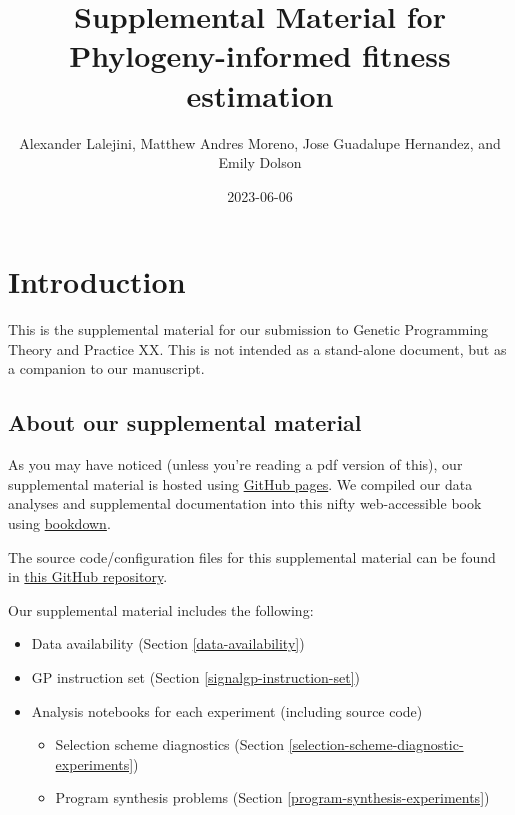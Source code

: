 \documentclass[
]{book}
\title{Supplemental Material for Phylogeny-informed fitness estimation}
\author{Alexander Lalejini, Matthew Andres Moreno, Jose Guadalupe Hernandez, and Emily Dolson}
\date{2023-06-06}
\providecommand{\tightlist}{%
  \setlength{\itemsep}{0pt}\setlength{\parskip}{0pt}}
\begin{document}
\maketitle

{
\setcounter{tocdepth}{1}
\tableofcontents
}
\hypertarget{introduction}{%
\chapter{Introduction}\label{introduction}}

This is the supplemental material for our submission to Genetic Programming Theory and Practice XX.
This is not intended as a stand-alone document, but as a companion to our manuscript.

\hypertarget{about-our-supplemental-material}{%
\section{About our supplemental material}\label{about-our-supplemental-material}}

As you may have noticed (unless you're reading a pdf version of this), our supplemental material is hosted using \href{https://pages.github.com/}{GitHub pages}.
We compiled our data analyses and supplemental documentation into this nifty web-accessible book using \href{https://bookdown.org}{bookdown}.

The source code/configuration files for this supplemental material can be found in \href{https://github.com/amlalejini/GPTP-2023-phylogeny-informed-evaluation}{this GitHub repository}.

Our supplemental material includes the following:

\begin{itemize}
\tightlist
\item
  Data availability (Section \ref{data-availability})
\item
  GP instruction set (Section \ref{signalgp-instruction-set})
\item
  Analysis notebooks for each experiment (including source code)

  \begin{itemize}
  \tightlist
  \item
    Selection scheme diagnostics (Section \ref{selection-scheme-diagnostic-experiments})
  \item
    Program synthesis problems (Section \ref{program-synthesis-experiments})
  \end{itemize}
\end{itemize}
\end{document}
